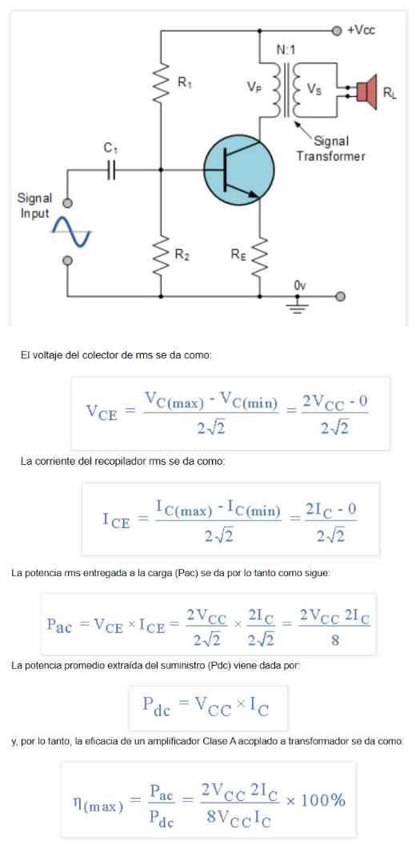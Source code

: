 \documentclass[12pt,a4paper]{article}
\begin{document}
\begin{center}
\includegraphics[scale=1.2]{imagenes/transformador.JPG}
\end{center}
\newpage 
\begin{center}
\includegraphics[scale=0.8]{imagenes/calculos.JPG}
\includegraphics[scale=0.8]{imagenes/calculos1.JPG} 
\end{center}
\end{document}
